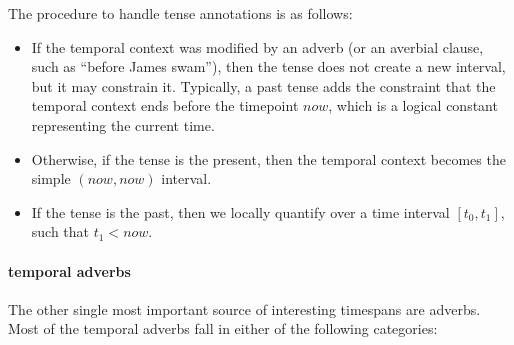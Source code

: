 \documentclass[a4paper,11pt]{article}
\begin{document}
The procedure to handle tense annotations is as follows:
\begin{itemize}
\item If the temporal context was modified by an adverb (or an
  averbial clause, such as ``before James swam''), then the tense does
  not create a new interval, but it may constrain it. Typically, a
  past tense adds the constraint that the temporal context ends before
  the timepoint $now$, which is a logical constant representing the current
  time.
\item Otherwise, if the tense is the present, then the temporal
  context becomes the simple $(now,now)$ interval.
\item
  If the tense is the past, then we locally quantify over a time
  interval $[t_0,t_1]$, such that $t_1 < now$.
\end{itemize}

\paragraph{temporal adverbs}

The other single most important source of interesting timespans are
adverbs. Most of the temporal adverbs fall in either of the following
categories:
\end{document}
